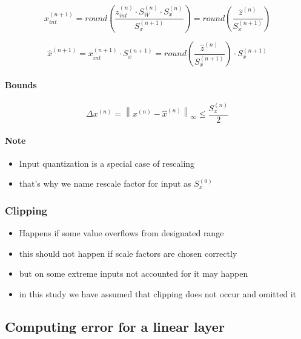 \documentclass[11pt, a4paper]{article}
\newcommand{\norm}[1]{\left\|#1\right\|}
\newcommand{\Sx}{S_x}
\newcommand{\zn}{z^{(n)}}
\newcommand{\znhat}{\hat{z}^{(n)}}
\newcommand{\xn}{x^{(n)}}
\newcommand{\xnhat}{\hat{x}^{(n)}}
\newcommand{\SWn}{S_W^{(n)}}
\newcommand{\Sxn}{S_x^{(n)}}
\newcommand{\Sxnpo}{S_x^{(n+1)}}
\newcommand{\xnpo}{x^{(n+1)}}
\newcommand{\xnpoh}{\hat{x}^{(n+1)}}
\begin{document}
$$ \xnpo_{int} = round\!\left(\frac{\zn_{int} \cdot \SWn \cdot \Sxn }{\Sxnpo}\right) = round\!\left(\frac{\znhat}{\Sxnpo}\right)$$

$$
    \xnpoh = \xnpo_{int} \cdot \Sxnpo = round\!\left(\frac{\znhat}{\Sxnpo}\right) \cdot \Sxnpo
$$

\paragraph{Bounds}

\begin{equation}
 \Delta \xn = \norm{\xn - \xnhat}_{\infty}
\leq \frac{\Sxn}{2}
\end{equation}

\paragraph{Note}
\begin{itemize}
	\item Input quantization is a special case of rescaling
	\item that's why we name rescale factor for input as $\Sx^{(0)}$
\end{itemize}


\subsubsection{Clipping}

\begin{itemize}
	\item Happens if some value overflows from designated range
	\item this should not happen if scale factors are chosen correctly
	\item but on some extreme inputs not accounted for it may happen
	\item in this study we have assumed that clipping does not occur and omitted it
\end{itemize}

\subsection{Computing error for a linear layer}
\end{document}
